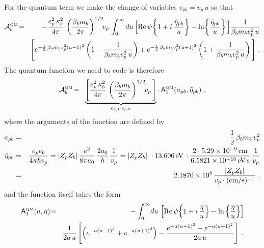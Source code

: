 \documentclass[preprint,12pt,eqsecnum,nofootinbib,amsmath,amssymb]{revtex4}
\newcommand{\smQM}{{\rm\scriptscriptstyle QM}}
\begin{document}
For the quantum term we make the change of variables
$v_{pb}= v_p\,u$ so that
\begin{eqnarray}
  {\cal A}^\smQM_b
  &\!=\!&  
  -\frac{e_p^2\, \kappa_b^2}{4\pi}\,
  \left( \frac{\beta_b m_b}{2\pi} \right)^{1/2} \!\! v_p\,
  \int_0^\infty du\, 
  \Big[{\rm Re}\,\psi\!\left\{ 1 + i\, \frac{\bar\eta_{pb}}{u}
  \right\}
  - \ln\!\left\{\frac{\bar\eta_{pb}}{u} \right\} \Big] 
  \frac{1}{\beta_b m_b v_p^2\,u}
\nonumber
\\ &&
  \Bigg[ e^{-\frac{1}{2}\,\beta_b m_b v_p^2 (u-1)^2} 
  \left(1 - \frac{1}{\beta_b m_b v_p^2\, u}\right) +
  e^{-\frac{1}{2}\,\beta_b m_b v_p^2 (u+1)^2}  
  \left(1 + \frac{1}{\beta_b m_b v_p^2\, u}\right)
  \Bigg] \ .
\end{eqnarray}
The quantum function we need to code is therefore
\begin{eqnarray}
  {\cal A}^\smQM_b
  &\!=\!&  
  \underbrace{
  \left[\frac{e_p^2\, \kappa_b^2}{4\pi}\,
  \left( \frac{\beta_b m_b}{2\pi} \right)^{1/2} \!\! v_p\,
  \right] 
  }_{c_{b, 1} \cdot c_{b, 2}}
  \cdot \,
  {\sf A}_1^\smQM(a_{pb}, \tilde\eta_{pb}) \ ,
\label{qmA}
\end{eqnarray}
where the arguments of the function are defined by 
\begin{eqnarray}
  a_{pb} 
  &=& 
  \frac{1}{2}\,\beta_b m_b\, v_p^2
\\
  \tilde\eta_{pb}
  &=& 
  \frac{e_p e_b}{4 \pi \hbar v_p}
  =
  \vert Z_p Z_b\vert\,\frac{e^2}{8 \pi a_0}\,\frac{2 a_0}{\hbar}\,
  \frac{1}{v_p}
  =
  \vert Z_p Z_b\vert\ \cdot 13.606\,{\rm eV}\,\cdot
  \frac{2 \cdot 5.29 \times 10^{-9}\,{\rm cm}}{6.5821 \times
  10^{-16}\,{\rm eV\,s}}\,
  \frac{1}{v_p}
\nonumber
\\
  &=&
  2.1870 \times 10^8 \, \frac{\vert Z_p Z_b\vert}{v_p
  \cdot ({\rm cm/s})^{-1}} \ ,
\end{eqnarray}
and the function itself takes the form
\begin{eqnarray}
  {\sf A}_1^\smQM(a,\eta)
  &\!=\!&  
  -\int_0^\infty \! du\, 
  \left[{\rm Re}\,\psi\! \left\{1 + i\, \frac{\eta}{u} \right\} - 
  \ln\left\{ \frac{\eta}{u}  \right\} \right]
\nonumber
\\ && 
  \frac{1}{2 a\,u}\left[\left(e^{-a(u-1)^2} + e^{-a(u+1)^2} \right) 
  - \frac{e^{-a(u-1)^2} - e^{-a(u+1)^2} } {2 a\, u}\right] \ .
\label{qmAB}
\end{eqnarray}
\end{document}
